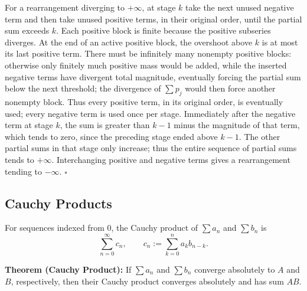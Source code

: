 \documentclass[a4paper,11pt,abstracton]{scrartcl}
\theoremstyle{dotlessP}
\theoremstyle{dotlessS}
\theoremstyle{remark}
\theoremstyle{definition}
\begin{document}
\begin{claim_box}
For a rearrangement diverging to $+\infty$, at stage $k$ take the
next unused negative term and then take unused positive terms, in
their original order, until the partial sum exceeds $k$. Each positive
block is finite because the positive subseries diverges. At the end of
an active positive block, the overshoot above $k$ is at most its last
positive term. There must be infinitely many nonempty positive blocks:
otherwise only finitely much positive mass would be added, while the
inserted negative terms have divergent total magnitude, eventually
forcing the partial sum below the next threshold; the divergence of
$\sum p_j$ would then force another nonempty block. Thus every positive
term, in its original order, is eventually used; every negative term
is used once per stage. Immediately after the negative term at stage
$k$, the sum is greater than $k-1$ minus the magnitude of that term,
which tends to zero, since the preceding stage ended above $k-1$. The
other partial sums in that stage only increase; thus the entire
sequence of partial sums tends to $+\infty$.
Interchanging positive and negative terms gives a rearrangement
tending to $-\infty$.
\hfill$\square$\end{claim_box}

\subsection{Cauchy Products}

\begin{definition_box}
For sequences indexed from $0$, the Cauchy product of $\sum a_n$ and
$\sum b_n$ is
\[
 \sum_{n=0}^{\infty}c_n,\qquad
 c_n:=\sum_{k=0}^n a_kb_{n-k}.
\]
\end{definition_box}

\begin{problem_box}
\textbf{Theorem (Cauchy Product):} If $\sum a_n$ and $\sum b_n$
converge absolutely to $A$ and $B$, respectively, then their Cauchy
product converges absolutely and has sum $AB$.
\end{problem_box}
\end{document}
